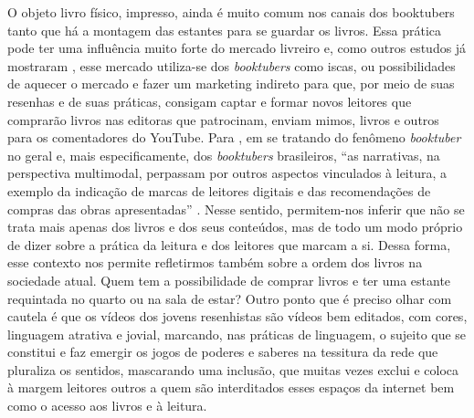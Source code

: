 O objeto livro físico, impresso, ainda é muito comum nos canais dos booktubers tanto que há a montagem das estantes para se guardar os livros. Essa prática pode ter uma influência muito forte do mercado livreiro e, como outros estudos já mostraram \cite{costa2018booktubers,aguiar2017critica}, esse mercado utiliza-se dos \textit{booktubers} como iscas, ou possibilidades de aquecer o mercado e fazer um marketing indireto para que, por meio de suas resenhas e de suas práticas, consigam captar e formar novos leitores que comprarão livros nas editoras que patrocinam, enviam mimos, livros e outros para os comentadores do YouTube. Para \textcite{fialho2023booktubers}, em se tratando do fenômeno \textit{booktuber} no geral e, mais especificamente, dos \textit{booktubers} brasileiros, “as narrativas, na perspectiva multimodal, perpassam por outros aspectos vinculados à leitura, a exemplo da indicação de marcas de leitores digitais e das recomendações de compras das obras apresentadas” \cite[p. 12]{fialho2023booktubers}. Nesse sentido, permitem-nos inferir que não se trata mais apenas dos livros e dos seus conteúdos, mas de todo um modo próprio de dizer sobre a prática da leitura e dos leitores que marcam a si. Dessa forma, esse contexto nos permite refletirmos também sobre a ordem dos livros na sociedade atual. Quem tem a possibilidade de comprar livros e ter uma estante requintada no quarto ou na sala de estar? Outro ponto que é preciso olhar com cautela é que os vídeos dos jovens resenhistas são vídeos bem editados, com cores, linguagem atrativa e jovial, marcando, nas práticas de linguagem, o sujeito que se constitui e faz emergir os jogos de poderes e saberes na tessitura da rede que pluraliza os sentidos, mascarando uma inclusão, que muitas vezes exclui e coloca à margem leitores outros a quem são interditados esses espaços da internet bem como o acesso aos livros e à leitura. 


